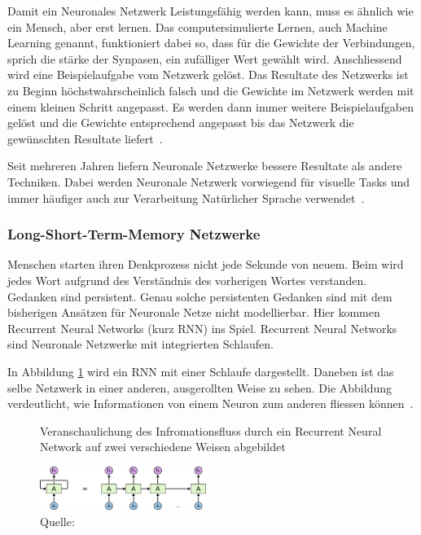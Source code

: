 \documentclass{hwz}
\begin{document}
Damit ein Neuronales Netzwerk Leistungsfähig werden kann, muss es ähnlich wie ein Mensch, aber erst lernen. Das computersimulierte Lernen, auch Machine Learning genannt, funktioniert dabei so, dass für die Gewichte der Verbindungen, sprich die stärke der Synpasen, ein zufälliger Wert gewählt wird. Anschliessend wird eine Beispielaufgabe vom Netzwerk gelöst. Das Resultate des Netzwerks ist zu Beginn höchstwahrscheinlich falsch und die Gewichte im Netzwerk werden mit einem kleinen Schritt angepasst. Es werden dann immer weitere Beispielaufgaben gelöst und die Gewichte entsprechend angepasst bis das Netzwerk die gewünschten Resultate liefert~\autocite{Krogh2008WhatNetworks}.

Seit mehreren Jahren liefern Neuronale Netzwerke bessere Resultate als andere Techniken. Dabei werden Neuronale Netzwerk vorwiegend für visuelle Tasks und immer häufiger auch zur Verarbeitung Natürlicher Sprache verwendet~\autocite{Olah2014DeepRepresentations}.



\subsubsection{Long-Short-Term-Memory Netzwerke}

Menschen starten ihren Denkprozess nicht jede Sekunde von neuem. Beim wird jedes Wort aufgrund des Verständnis des vorherigen Wortes verstanden. Gedanken sind persistent. Genau solche persistenten Gedanken sind mit dem bisherigen Ansätzen für Neuronale Netze nicht modellierbar. Hier kommen Recurrent Neural Networks (kurz RNN) ins Spiel. Recurrent Neural Networks sind Neuronale Netzwerke mit integrierten Schlaufen. 

In Abbildung \ref{rnn1} wird ein RNN mit einer Schlaufe dargestellt. Daneben ist das selbe Netzwerk in einer anderen, ausgerollten Weise zu sehen. Die Abbildung verdeutlicht, wie Informationen von einem Neuron zum anderen fliessen können~\autocite{Olah2015UnderstandingNetworks}.
\begin{figure}[h]
    \caption{Veranschaulichung des Infromationsfluss durch ein Recurrent Neural Network auf zwei verschiedene Weisen abgebildet}
    \label{rnn1}
    \centering
    \includegraphics[width=0.48\textwidth]{graphics/rnn1.png}
    \caption*{Quelle: \textcite{Olah2015UnderstandingNetworks}}
\end{figure}
\end{document}
